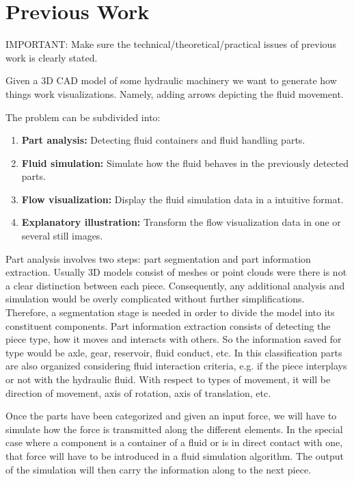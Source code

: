 \chapter{Previous Work}
\label{ch:prevWork}

IMPORTANT: Make sure the technical/theoretical/practical issues of previous work is clearly stated.

Given a 3D CAD model of some hydraulic machinery we want to generate how things work visualizations.
Namely, adding arrows depicting the fluid movement.

The problem can be subdivided into:
\begin{enumerate}
\item \textbf{Part analysis:} Detecting fluid containers and fluid handling parts.
\item \textbf{Fluid simulation:} Simulate how the fluid behaves in the previously detected parts.
\item \textbf{Flow visualization:} Display the fluid simulation data in a intuitive format.
\item \textbf{Explanatory illustration:} Transform the flow visualization data in one or several still images.
\end{enumerate}

Part analysis involves two steps: part segmentation and part information extraction.
Usually 3D models consist of meshes or point clouds were there is not a clear distinction between each piece.
Consequently, any additional analysis and simulation would be overly complicated without further simplifications.  
Therefore, a segmentation stage is needed in order to divide the model into its constituent components.
Part information extraction consists of detecting the piece type, how it moves and interacts with others.
So the information saved for type would be axle, gear, reservoir, fluid conduct, etc.
In this classification parts are also organized considering fluid interaction criteria, e.g. if the piece interplays or not with the hydraulic fluid.
With respect to types of movement, it will be direction of movement, axis of rotation, axis of translation, etc.

Once the parts have been categorized and given an input force, we will have to simulate how the force is transmitted along the different elements.
In the special case where a component is a container of a fluid or is in direct contact with one, that force will have to be introduced in a fluid simulation algorithm.
The output of the simulation will then carry the information along to the next piece.

